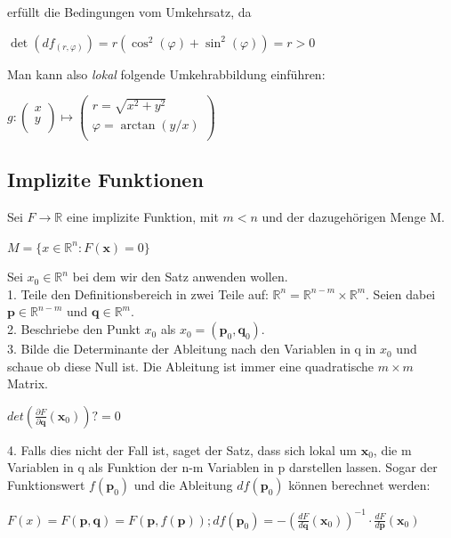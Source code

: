 \documentclass[a4paper, fontsize = 8pt, landscape]{scrartcl}
\newcommand{\R}[0]{\mathbb{R}}
\begin{document}
\begin{multicols*}{3}
    erfüllt die Bedingungen vom Umkehrsatz, da

    \begin{center}
        $\det(df_{(r, \varphi)}) = r(\cos^2(\varphi) + \sin^2(\varphi)) = r > 0$
    \end{center}

    Man kann also \emph{lokal} folgende Umkehrabbildung einführen:

    \begin{center}
        $g:\begin{pmatrix}
                x \\ y \\
            \end{pmatrix} \mapsto \begin{pmatrix}
                r = \sqrt{x^2 + y^2} \\ \varphi = \arctan(y/x) \\
            \end{pmatrix}$
    \end{center}


    \subsection{Implizite Funktionen}
    Sei $F \rightarrow \R$ eine implizite Funktion, mit $m < n$ und der dazugehörigen Menge M.
    \begin{center}
        $M = \{x \in \R^n: F(\mathbf{x}) = 0\}$
    \end{center}
    Sei $x_0 \in \R^n$ bei dem wir den Satz anwenden wollen. \\
    1. Teile den Definitionsbereich in zwei Teile auf: $\R^n = \R^{n-m} \times \R^m$. Seien dabei $\mathbf{p} \in \R^{n-m}$ und $\mathbf{q} \in \R^m$.   \\
    2. Beschriebe den Punkt $x_0$ als $x_0 = (\mathbf{p}_0, \mathbf{q}_0)$. \\
    3. Bilde die Determinante der Ableitung nach den Variablen in q in $x_0$ und schaue ob diese Null ist. Die Ableitung ist immer eine quadratische $m \times m$ Matrix.
    \begin{center}
        $det(\frac{\partial F}{\partial \mathbf{q}}(\mathbf{x}_0)) ?= 0$
    \end{center}
    4. Falls dies nicht der Fall ist, saget der Satz, dass sich lokal um $\mathbf{x}_0$, die m Variablen in q als Funktion der n-m Variablen in p darstellen lassen. Sogar der Funktionswert $f(\mathbf{p}_0)$ und die Ableitung $df(\mathbf{p}_0)$ können berechnet werden:
    \begin{center}
        $F(x) = F(\mathbf{p}, \mathbf{q}) = F(\mathbf{p}, f(\mathbf{p}))
            ;df(\mathbf{p}_0) = -(\frac{dF}{d\mathbf{q}}(\mathbf{x}_0))^{-1} \cdot \frac{dF}{d\mathbf{p}}(\mathbf{x}_0)$
    \end{center}


\end{multicols*}
\end{document}
